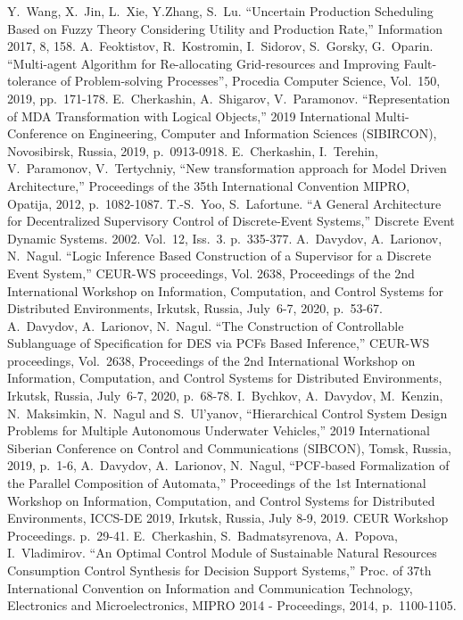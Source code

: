 \documentclass[conference,a4paper]{IEEEtran}
\begin{document}
\begin{thebibliography}{999}
     Y.~Wang, X.~Jin, L.~Xie, Y.Zhang, S.~Lu. ``Uncertain Production Scheduling Based on Fuzzy Theory Considering Utility and Production Rate,'' Information 2017, 8, 158.
     A.~Feoktistov, R.~Kostromin, I.~Sidorov, S.~Gorsky, G.~Oparin. ``Multi-agent Algorithm for Re-allocating Grid-resources and Improving Fault-tolerance of Problem-solving Processes'', Procedia Computer Science, Vol.~150, 2019, pp.~171-178. 
     E.~Cherkashin, A.~Shigarov, V.~Paramonov. ``Representation of MDA Transformation with Logical Objects,'' 2019 International Multi-Conference on Engineering, Computer and Information Sciences (SIBIRCON), Novosibirsk, Russia, 2019, p.~0913-0918. 
     E.~Cherkashin, I.~Terehin, V.~Paramonov, V.~Tertychniy, ``New transformation approach for Model Driven Architecture,'' Proceedings of the 35th International Convention MIPRO, Opatija, 2012, p.~1082-1087.
     T.-S.~Yoo, S.~Lafortune. ``A General Architecture for Decentralized Supervisory Control of Discrete-Event Systems,'' Discrete Event Dynamic Systems. 2002. Vol.~12, Iss.~3. p.~335-377. 
     A.~Davydov, A.~Larionov, N.~Nagul. ``Logic Inference Based Construction of a Supervisor for a Discrete Event System,'' CEUR-WS proceedings, Vol. 2638, Proceedings of the 2nd International Workshop on Information, Computation, and Control Systems for Distributed Environments, Irkutsk, Russia, July~6-7, 2020,  p.~53-67.
     A.~Davydov, A.~Larionov, N.~Nagul. ``The Construction of Controllable Sublanguage of Specification for DES via PCFs Based Inference,'' CEUR-WS proceedings, Vol.~2638, Proceedings of the 2nd International Workshop on Information, Computation, and Control Systems for Distributed Environments, Irkutsk, Russia, July~6-7, 2020, p.~68-78.
     I.~Bychkov, A.~Davydov, M.~Kenzin, N.~Maksimkin, N.~Nagul and S.~Ul’yanov, ``Hierarchical Control System Design Problems for Multiple Autonomous Underwater Vehicles,'' 2019 International Siberian Conference on Control and Communications (SIBCON), Tomsk, Russia, 2019, p.~1-6, 
     A.~Davydov, A.~Larionov, N.~Nagul, ``PCF-based Formalization of the Parallel Composition of Automata,'' Proceedings of the 1st International Workshop on Information, Computation, and Control Systems for Distributed Environments, ICCS-DE 2019, Irkutsk, Russia, July 8-9, 2019. CEUR Workshop Proceedings. p.~29-41.
     E.~Cherkashin, S.~Badmatsyrenova, A.~Popova, I.~Vladimirov. ``An Optimal Control Module of Sustainable Natural Resources Consumption Control Synthesis for Decision Support Systems,'' Proc. of 37th International Convention on Information and Communication Technology, Electronics and Microelectronics, MIPRO 2014 - Proceedings, 2014, p.~1100-1105.

\end{thebibliography}
\end{document}
